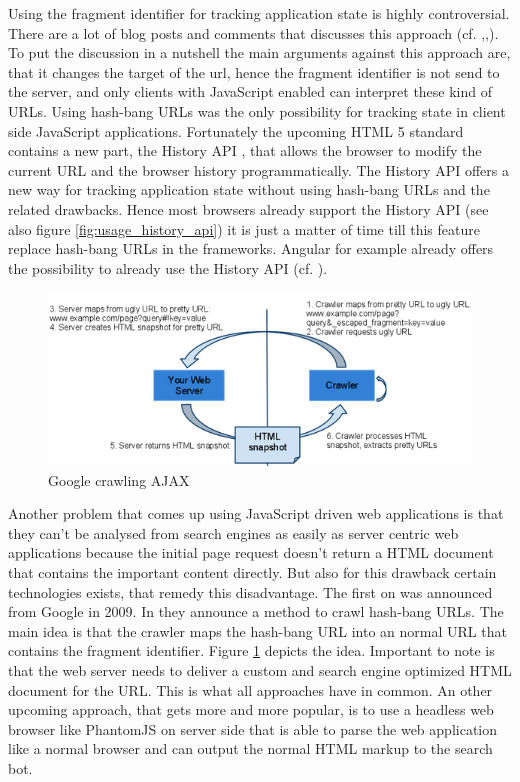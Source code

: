 Using the fragment identifier for tracking application state is highly controversial.
There are a lot of blog posts and comments that discusses this approach (cf.
\autocite[]{hashbang_urls_1},\autocite[]{hashbang_urls_2},\autocite[]{hashbang_urls_3}).
To put the discussion in a nutshell the main arguments against this approach are, that it changes the target of the url, hence the fragment identifier is not send to the server, and only clients with JavaScript enabled can interpret these kind of URLs.
Using hash-bang URLs was the only possibility for tracking state in client side JavaScript applications.
Fortunately the upcoming HTML 5 standard contains a new part, the History API \autocite[]{w3c-history-api}, that allows the browser to modify the current URL and the browser history programmatically.
The History API offers a new way for tracking application state without using hash-bang URLs and the related drawbacks.
Hence most browsers already support the History API (see also figure \ref{fig:usage_history_api}) it is just a matter of time till this feature replace hash-bang URLs in the frameworks.
Angular for example already offers the possibility to already use the History API (cf.
\autocite[]{angular_location}).

\begin{figure}
	\centering \includegraphics[width=1.0\textwidth]{./img/web-dev/google_crawling_hashbang.png}
	\caption{Google crawling AJAX \autocite{google_AJAX_crawling}}
	\label{fig:google_crawling_ajax}
\end{figure}

Another problem that comes up using JavaScript driven web applications is that they can't be analysed from search engines as easily as server centric web applications because the initial page request doesn't return a HTML document that contains the important content directly.
But also for this drawback certain technologies exists, that remedy this disadvantage.
The first on was announced from Google in 2009.
In \autocite[]{google_AJAX_crawling} they announce a method to crawl hash-bang URLs.
The main idea is that the crawler maps the hash-bang URL into an normal URL that contains the fragment identifier.
Figure \ref{fig:google_crawling_ajax} depicts the idea.
Important to note is that the web server needs to deliver a custom and search engine optimized HTML document for the URL.
This is what all approaches have in common.
An other upcoming approach, that gets more and more popular, is to use a headless web browser like PhantomJS on server side that is able to parse the web application like a normal browser and can output the normal HTML markup to the search bot.